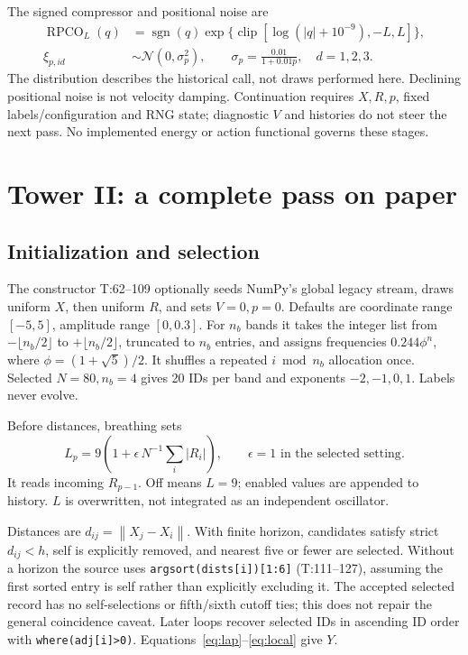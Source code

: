 \documentclass[11pt,a4paper]{article}
\newcommand{\src}[2]{\textsf{#1:#2}}
\newcommand{\sgn}{\operatorname{sgn}}
\newcommand{\clip}{\operatorname{clip}}
\newcommand{\norm}[1]{\left\lVert #1\right\rVert}
\begin{document}
The signed compressor and positional noise are
\begin{align}
\operatorname{RPCO}_L(q)&=\sgn(q)\exp\{\clip[\log(|q|+10^{-9}),-L,L]\},\label{eq:rpco}\\
\xi_{p,id}&\sim\mathcal N(0,\sigma_p^2),\qquad
\sigma_p=\frac{0.01}{1+0.01p},\quad d=1,2,3.\label{eq:noise}
\end{align}
The distribution describes the historical call, not draws performed here. Declining positional noise is not velocity damping. Continuation requires \(X,R,p\), fixed labels/configuration and RNG state; diagnostic \(V\) and histories do not steer the next pass. No implemented energy or action functional governs these stages.

\section{Tower II: a complete pass on paper}\label{sec:tower}
\subsection{Initialization and selection}
The constructor \src{T}{62--109} optionally seeds NumPy's global legacy stream, draws uniform \(X\), then uniform \(R\), and sets \(V=0,p=0\). Defaults are coordinate range \([-5,5]\), amplitude range \([0,0.3]\). For \(n_b\) bands it takes the integer list from \(-\lfloor n_b/2\rfloor\) to \(+\lfloor n_b/2\rfloor\), truncated to \(n_b\) entries, and assigns frequencies \(0.244\phi^n\), where \(\phi=(1+\sqrt5)/2\). It shuffles a repeated \(i\bmod n_b\) allocation once. Selected \(N=80,n_b=4\) gives 20 IDs per band and exponents \(-2,-1,0,1\). Labels never evolve.

Before distances, breathing sets
\begin{equation}\label{eq:LT}
L_p=9\left(1+\epsilon\,N^{-1}\sum_i|R_i|\right),\qquad
\epsilon=1\text{ in the selected setting}.
\end{equation}
It reads incoming \(R_{p-1}\). Off means \(L=9\); enabled values are appended to history. \(L\) is overwritten, not integrated as an independent oscillator.

Distances are \(d_{ij}=\norm{X_j-X_i}\). With finite horizon, candidates satisfy strict \(d_{ij}<h\), self is explicitly removed, and nearest five or fewer are selected. Without a horizon the source uses \texttt{argsort(dists[i])[1:6]} (\src{T}{111--127}), assuming the first sorted entry is self rather than explicitly excluding it. The accepted selected record has no self-selections or fifth/sixth cutoff ties; this does not repair the general coincidence caveat. Later loops recover selected IDs in ascending ID order with \texttt{where(adj[i]>0)}. Equations~\eqref{eq:lap}--\eqref{eq:local} give \(Y\).
\end{document}
